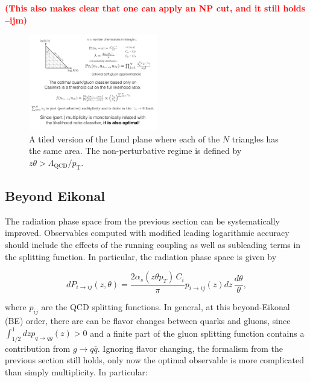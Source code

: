 \documentclass[letterpaper,11pt]{article}
\newcommand{\ijm}[1]{\marginpar{\raggedright\scriptsize\textbf{\textcolor{red}{ijm}}}  \textbf{\textcolor{red}{(#1 --ijm)}}}
\begin{document}
\ijm{This also makes clear that one can apply an NP cut, and it still holds}

\begin{figure}[t]
\centering
\includegraphics[width=0.5\textwidth]{figures/LundPlaneSchematic.pdf}
\caption{A tiled version of the Lund plane where each of the $N$ triangles has the same area.  The non-perturbative regime is defined by $z\theta>\Lambda_\text{QCD}/p_\text{T}$.}
\label{fig:lundschematic}
\end{figure}


\subsection{Beyond Eikonal}

The radiation phase space from the previous section can be systematically improved.  Observables computed with modified leading logarithmic accuracy should include the effects of the running coupling as well as subleading terms in the splitting function.  In particular, the radiation phase space is given by 


\begin{equation}
\label{eq:LLemit2}
dP_{i\to i j}(z,\theta) = \frac{2\alpha_s (z\theta p_T) \, C_i}{\pi} p_{i\to i j}(z) dz\,\frac{d\theta}{\theta},
\end{equation}

\noindent where $p_{ij}$ are the QCD splitting functions.  In general, at this beyond-Eikonal (BE) order, there are can be flavor changes between quarks and gluons, since $\int_{1/2}^1 dz p_{q\to qg}(z) > 0$ and a finite part of the gluon splitting function contains a contribution from $g\rightarrow q\bar{q}$.  Ignoring flavor changing, the formalism from the previous section still holds, only now the optimal observable is more complicated than simply multiplicity.   In particular:
\end{document}
